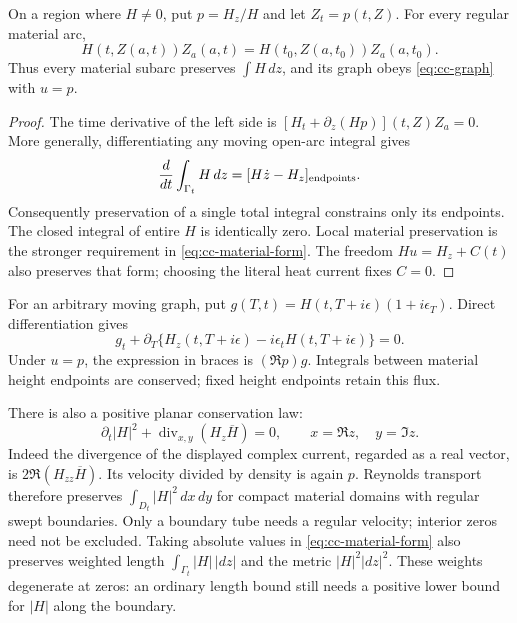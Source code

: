 \begin{proposition}
\label{prop:cc-heat-form}
On a region where $H\ne0$, put $p=H_z/H$ and let
$Z_t=p(t,Z)$.  For every regular material arc,
\begin{equation}
 H(t,Z(a,t))Z_a(a,t)
 =H(t_0,Z(a,t_0))Z_a(a,t_0).
 \label{eq:cc-material-form}
\end{equation}
Thus every material subarc preserves $\int H\,dz$, and its graph obeys
\eqref{eq:cc-graph} with $u=p$.
\end{proposition}
\begin{proof}
The time derivative of the left side is
$[H_t+\partial_z(Hp)](t,Z)Z_a=0$.
More generally, differentiating any moving open-arc integral gives
\begin{equation}
 \frac{d}{dt}\int_{\Gamma_t}H\,dz
 =[H\dot z-H_z]_{\rm endpoints}.
 \label{eq:cc-endpoints}
\end{equation}
Consequently preservation of a single total integral constrains only
its endpoints.  The closed integral of entire $H$ is identically zero.
Local material preservation is the stronger requirement in
\eqref{eq:cc-material-form}.  The freedom $Hu=H_z+C(t)$ also preserves
that form; choosing the literal heat current fixes $C=0$.
\end{proof}

For an arbitrary moving graph, put
$g(T,t)=H(t,T+i\epsilon)(1+i\epsilon_T)$.  Direct differentiation gives
\begin{equation}
 g_t+\partial_T\{H_z(t,T+i\epsilon)-i\epsilon_tH(t,T+i\epsilon)\}=0.
 \label{eq:cc-graph-density}
\end{equation}
Under $u=p$, the expression in braces is $(\Re p)g$.
Integrals between material height endpoints are conserved; fixed height
endpoints retain this flux.

There is also a positive planar conservation law:
\begin{equation}
 \partial_t|H|^2+\operatorname{div}_{x,y}(H_z\overline H)=0,
 \qquad x=\Re z,\quad y=\Im z.
 \label{eq:cc-positive}
\end{equation}
Indeed the divergence of the displayed complex current, regarded as a
real vector, is $2\Re(H_{zz}\overline H)$.  Its velocity divided by
density is again $p$.  Reynolds transport therefore preserves
$\int_{D_t}|H|^2\,dx\,dy$ for compact material domains with regular
swept boundaries.  Only a boundary tube needs a regular velocity;
interior zeros need not be excluded.  Taking absolute values in
\eqref{eq:cc-material-form} also preserves weighted length
$\int_{\Gamma_t}|H|\,|dz|$ and the metric $|H|^2|dz|^2$.
These weights degenerate at zeros: an ordinary length bound still needs
a positive lower bound for $|H|$ along the boundary.

